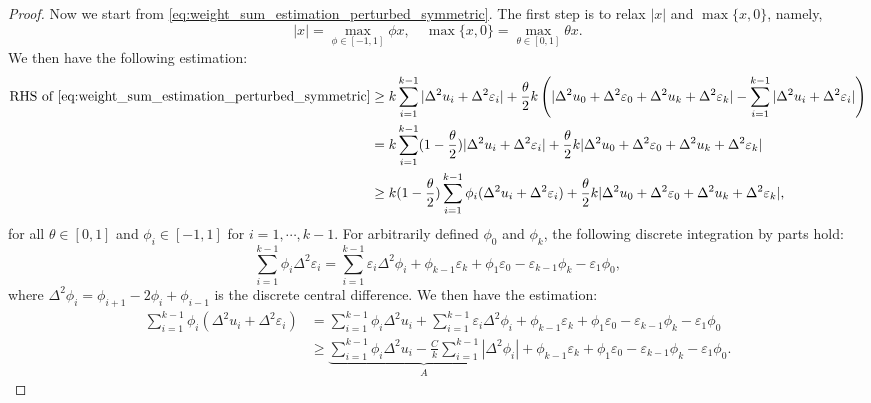 \documentclass[10pt,a4paper]{amsart}
\begin{document}
\begin{proof}
Now we start from \eqref{eq:weight_sum_estimation_perturbed_symmetric}. The first step is to relax $|x|$ and $\max\{x, 0\}$, namely,
\begin{equation}
    \label{eq:dual_representations}
    |x| = \max_{\phi\in [-1,1]} \phi x, \quad \max\{x, 0\} = \max_{\theta\in [0,1]} \theta x.
\end{equation}
We then have the following estimation:
\begin{equation}
    \begin{aligned}
        \text{RHS of }
        \eqref{eq:weight_sum_estimation_perturbed_symmetric}&\ge k\sum_{i=1}^{k-1} |\Delta^2 u_i+\Delta^2 \varepsilon_i|+ \frac \theta 2 k\left( |\Delta^2 u_0+\Delta^2 \varepsilon_0 + \Delta^2 u_k+\Delta^2 \varepsilon_k|-\sum_{i=1}^{k-1} |\Delta^2 u_i+\Delta^2 \varepsilon_i|\right)\\
        &=k\sum_{i=1}^{k-1} (1-\frac \theta 2) |\Delta^2 u_i+\Delta^2 \varepsilon_i| + \frac \theta 2 k|\Delta^2 u_0+\Delta^2 \varepsilon_0 + \Delta^2 u_k+\Delta^2 \varepsilon_k|\\
        & \ge k(1-\frac{\theta}{2})\sum_{i=1}^{k-1}  \phi_i(\Delta^2 u_i+\Delta^2 \varepsilon_i) + \frac \theta 2 k|\Delta^2 u_0+\Delta^2 \varepsilon_0 + \Delta^2 u_k+\Delta^2 \varepsilon_k|,
    \end{aligned}
\end{equation}
for all $\theta\in [0,1]$ and $\phi_i\in [-1,1]$ for $i=1, \cdots, k-1$.
For arbitrarily defined $\phi_0$ and $\phi_k$, the following discrete integration by parts hold:
\begin{equation}
    \sum_{i=1}^{k-1}\phi_i\Delta^2 \varepsilon_i =\sum_{i=1}^{k-1} \varepsilon_i \Delta^2\phi_i + \phi_{k-1} \varepsilon_k+\phi_1 \varepsilon_0-\varepsilon_{k-1}\phi_k-\varepsilon_1\phi_0,
\end{equation}
where $\Delta^2 \phi_i = \phi_{i+1}-2\phi_i+\phi_{i-1}$ is the discrete central difference. We then have the estimation:
\begin{equation}
    \begin{aligned}
            \sum_{i=1}^{k-1}  \phi_i(\Delta^2 u_i+\Delta^2 \varepsilon_i) &= \sum_{i=1}^{k-1} \phi_i\Delta^2 u_i+\sum_{i=1}^{k-1} \varepsilon_i \Delta^2\phi_i + \phi_{k-1} \varepsilon_k+\phi_1 \varepsilon_0-\varepsilon_{k-1}\phi_k-\varepsilon_1\phi_0\\
            &\ge \underbrace{\sum_{i=1}^{k-1} \phi_i\Delta^2 u_i- \frac{C}{k}\sum_{i=1}^{k-1} |\Delta^2\phi_i|}_{A} + \phi_{k-1} \varepsilon_k+\phi_1 \varepsilon_0-\varepsilon_{k-1}\phi_k-\varepsilon_1\phi_0.

\end{aligned}
\end{equation}
\end{proof}
\end{document}
